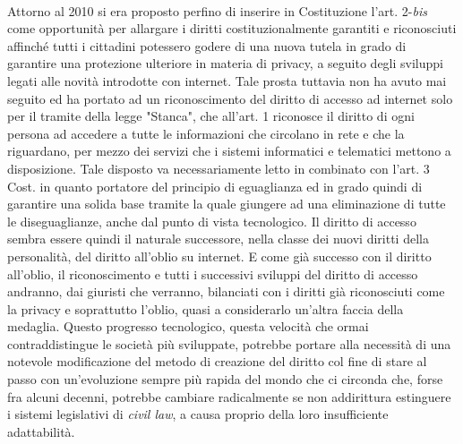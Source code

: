 \\Attorno al 2010 si era proposto perfino di inserire in Costituzione l'art. 2-\textit{bis} come opportunità per allargare i diritti costituzionalmente garantiti e riconosciuti affinché tutti i cittadini potessero godere di una nuova tutela in grado di garantire una protezione ulteriore in materia di privacy, a seguito degli sviluppi legati alle novità introdotte con internet. Tale prosta tuttavia non ha avuto mai seguito ed ha portato ad un riconoscimento del diritto di accesso ad internet solo per il tramite della legge "Stanca", che all'art. 1 riconosce il diritto di ogni persona ad accedere a tutte le informazioni che circolano in rete e che la riguardano, per mezzo dei servizi che i sistemi informatici e telematici mettono a disposizione. Tale disposto va necessariamente letto in combinato con l'art. 3 Cost. in quanto portatore del principio di eguaglianza ed in grado quindi di garantire una solida base tramite la quale giungere ad una eliminazione di tutte le diseguaglianze, anche dal punto di vista tecnologico.
Il diritto di accesso sembra essere quindi il naturale successore, nella classe dei nuovi diritti della personalità, del diritto all'oblio su internet. 
E come già successo con il diritto all'oblio, il riconoscimento e tutti i successivi sviluppi del diritto di accesso andranno, dai giuristi che verranno, bilanciati con i diritti già riconosciuti come la privacy e soprattutto l'oblio, quasi a considerarlo un'altra faccia della medaglia.
Questo progresso tecnologico, questa velocità che ormai contraddistingue le società più sviluppate, potrebbe portare alla necessità di una notevole modificazione del metodo di creazione del diritto col fine di stare al passo con un'evoluzione sempre più rapida del mondo che ci circonda che, forse fra alcuni decenni, potrebbe cambiare radicalmente se non addirittura estinguere i sistemi legislativi di \textit{civil law}, a causa proprio della loro insufficiente adattabilità.


